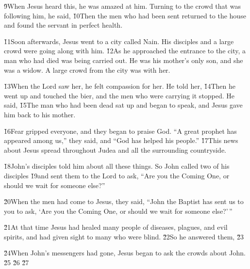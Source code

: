\v{9}When Jesus heard this, he was amazed at him. Turning to the crowd that was following him, he said,  \v{10}Then the men who had been sent returned to the house and found the servant in perfect health.

\v{11}Soon afterwards, Jesus went to a city called Nain. His disciples and a large crowd were going along with him. \v{12}As he approached the entrance to the city, a man who had died was being carried out. He was his mother's only son, and she was a widow. A large crowd from the city was with her.

\v{13}When the Lord saw her, he felt compassion for her. He told her,  \v{14}Then he went up and touched the bier, and the men who were carrying it stopped. He said,  \v{15}The man who had been dead sat up and began to speak, and Jesus gave him back to his mother.

\v{16}Fear gripped everyone, and they began to praise God. ``A great prophet has appeared among us,'' they said, and ``God has helped his people.'' \v{17}This news about Jesus spread throughout Judea and all the surrounding countryside.

\v{18}John's disciples told him about all these things. So John called two of his disciples \v{19}and sent them to the Lord to ask, ``Are you the Coming One, or should we wait for someone else?''

\v{20}When the men had come to Jesus, they said, ``John the Baptist has sent us to you to ask, `Are you the Coming One, or should we wait for someone else?'\,''

\v{21}At that time Jesus had healed many people of diseases, plagues, and evil spirits, and had given sight to many who were blind. \v{22}So he answered them,  \v{23}

\v{24}When John's messengers had gone, Jesus began to ask the crowds about John.  \v{25} \v{26} \v{27} 

